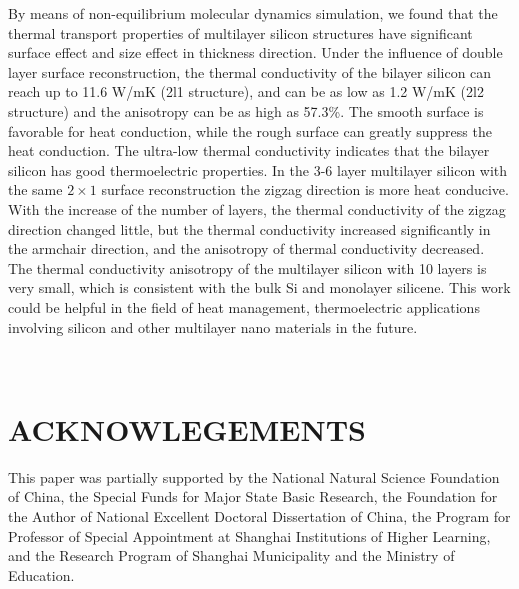 \documentclass[%
 reprint,
 amsmath,amssymb,
 aps,
 prb,
]{revtex4-1}
\begin{document}
By means of non-equilibrium molecular dynamics simulation, we found that the thermal transport properties of multilayer silicon structures have significant surface effect and size effect in thickness direction. Under the influence of double layer surface reconstruction, the thermal conductivity of the bilayer silicon can reach up to 11.6 W/mK (2l1 structure), and can be as low as 1.2 W/mK (2l2 structure) and the anisotropy can be as high as 57.3\%. The smooth surface is favorable for heat conduction, while the rough surface can greatly suppress the heat conduction. The ultra-low thermal conductivity indicates that the bilayer silicon has good thermoelectric properties. In the 3-6 layer multilayer silicon with the same $2 \times 1$ surface reconstruction the zigzag direction is more heat conducive. With the increase of the number of layers, the thermal conductivity of the zigzag direction changed little, but the thermal conductivity increased significantly in the armchair direction, and the anisotropy of thermal conductivity decreased. The thermal conductivity anisotropy of the multilayer silicon with 10 layers is very small, which is consistent with the bulk Si and monolayer silicene. This work could be helpful in the field of heat management, thermoelectric applications involving silicon and other multilayer nano materials in the future.

\quad \\
\section{ACKNOWLEGEMENTS}
This paper was partially supported by the National Natural Science Foundation of China, the Special Funds for Major State Basic Research, the Foundation for the Author of National Excellent Doctoral Dissertation of China, the Program for Professor of Special Appointment at Shanghai Institutions of Higher Learning, and the Research Program of Shanghai Municipality and the Ministry of Education.



\end{document}
